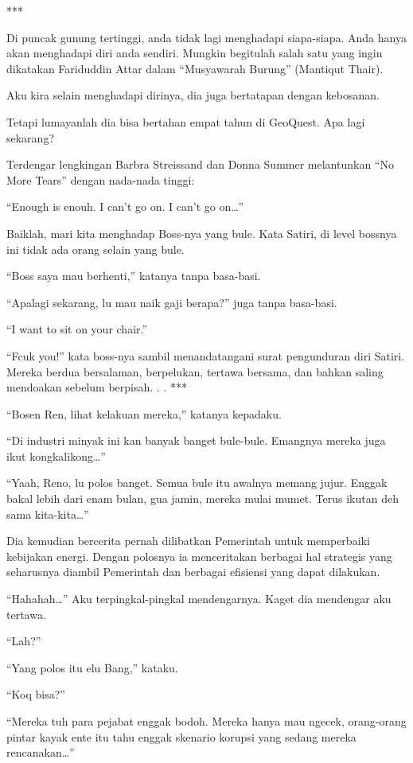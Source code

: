 ***

Di puncak gunung tertinggi, anda tidak lagi menghadapi siapa-siapa. Anda hanya akan menghadapi diri anda sendiri. Mungkin begitulah salah satu yang ingin dikatakan Fariduddin Attar dalam “Musyawarah Burung” (Mantiqut Thair).

Aku kira selain menghadapi dirinya, dia juga bertatapan dengan kebosanan.

Tetapi lumayanlah dia bisa bertahan empat tahun di GeoQuest. Apa lagi sekarang?

Terdengar lengkingan Barbra Streissand dan Donna Summer melantunkan “No More Tears” dengan nada-nada tinggi:

“Enough is enouh. I can’t go on. I can’t go on…”

Baiklah, mari kita menghadap Boss-nya yang bule. Kata Satiri, di level bossnya ini tidak ada orang selain yang bule.

“Boss saya mau berhenti,” katanya tanpa basa-basi.

“Apalagi sekarang, lu mau naik gaji berapa?” juga tanpa basa-basi.

“I want to sit on your chair.”

“Fcuk you!” kata boss-nya sambil menandatangani surat pengunduran diri Satiri. Mereka berdua bersalaman, berpelukan, tertawa bersama, dan bahkan saling mendoakan sebelum berpisah.
.
.
***

“Bosen Ren, lihat kelakuan mereka,” katanya kepadaku.

“Di industri minyak ini kan banyak banget bule-bule. Emangnya mereka juga ikut kongkalikong…”

“Yaah, Reno, lu polos banget. Semua bule itu awalnya memang jujur. Enggak bakal lebih dari enam bulan, gua jamin, mereka mulai mumet. Terus ikutan deh sama kita-kita…”

Dia kemudian bercerita pernah dilibatkan Pemerintah untuk memperbaiki kebijakan energi. Dengan polosnya ia menceritakan berbagai hal strategis yang seharusnya diambil Pemerintah dan berbagai efisiensi yang dapat dilakukan.

“Hahahah…” Aku terpingkal-pingkal mendengarnya. Kaget dia mendengar aku tertawa.

“Lah?”

“Yang polos itu elu Bang,” kataku.

“Koq bisa?”

“Mereka tuh para pejabat enggak bodoh. Mereka hanya mau ngecek, orang-orang pintar kayak ente itu tahu enggak skenario korupsi yang sedang mereka rencanakan…”


